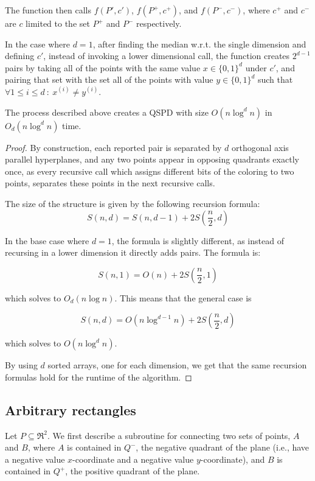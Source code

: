 \documentclass[12pt]{article}%
\begin{document}
The function then calls $f(P', c')$, $f(P^+, c^+)$, and $f(P^-, c^-)$, where $c^+$ and $c^-$ are $c$ limited to the set $P^+$ and $P^-$ respectively.

In the case where $d=1$, after finding the median w.r.t. the single dimension and defining $c'$, instead of invoking a lower dimensional call, the function creates $2^{d-1}$ pairs by taking all of the points with the same value $x\in\{0,1\}^d$ under $c'$, and pairing that set with the set all of the points with value $y\in\{0,1\}^d$ such that $\forall 1\leq i\leq d~:~ x^{(i)}\neq y^{(i)}$.


\begin{claim}
	The process described above creates a QSPD with size $O(n\log^dn)$ in $O_d(n\log^dn)$ time.
\end{claim}

\begin{proof}
	By construction, each reported pair is separated by $d$ orthogonal axis parallel hyperplanes, and any two points appear in opposing quadrants exactly once, as every recursive call which assigns different bits of the coloring to two points, separates these points in the next recursive calls. 
	
	The size of the structure is given by the following recursion formula:
	$$S(n,d) = S(n,d-1) + 2S\left(\frac{n}{2},d\right)$$
	
	In the base case where $d=1$, the formula is slightly different, as instead of recursing in a lower dimension it directly adds pairs. The formula is:
	
	$$S(n,1) = O(n) + 2S\left(\frac{n}{2},1\right)$$
	
	which solves to $O_d(n\log n)$. This means that the general case is 
	
	$$S(n,d) = O(n\log^{d-1}n) + 2S\left(\frac{n}{2},d\right)$$
	
	which solves to $O(n\log^d n)$.
	
	By using $d$ sorted arrays, one for each dimension, we get that the same recursion formulas hold for the runtime of the algorithm.
\end{proof}

\subsection{Arbitrary rectangles}

Let $P\subseteq \Re^2$. We first describe a subroutine for connecting two sets of points, $A$ and $B$, where $A$ is contained in $Q^-$, the negative quadrant of the plane (i.e., have a negative value $x$-coordinate and a negative value $y$-coordinate), and $B$ is contained in $Q^+$, the positive quadrant of the plane. 
\end{document}
